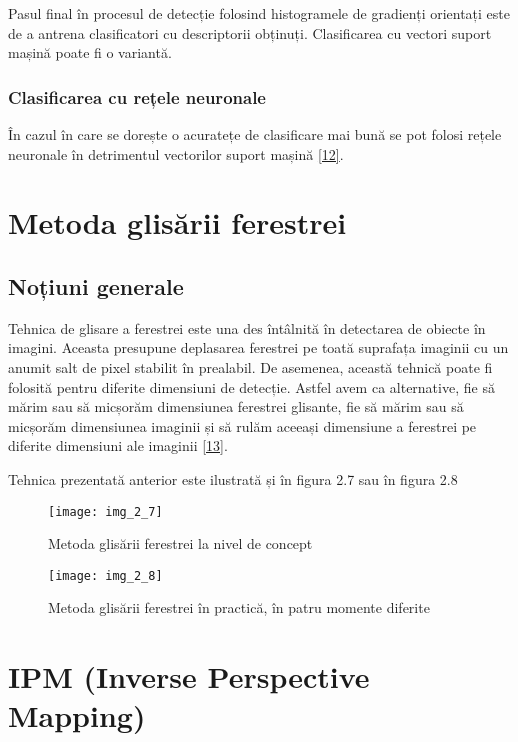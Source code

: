 Pasul final în procesul de detecție folosind histogramele de gradienți orientați este de a antrena clasificatori cu descriptorii obținuți. Clasificarea cu vectori suport mașină poate fi o variantă.

\subsubsection {Clasificarea cu rețele neuronale}

În cazul în care se dorește o acuratețe de clasificare mai bună se pot folosi rețele neuronale în detrimentul vectorilor suport mașină \hyperlink{NavneetDalalBillTriggs}{[12]}.

\section{Metoda glisării ferestrei}

\subsection{Noțiuni generale}

Tehnica de glisare a ferestrei este una des întâlnită în detectarea de obiecte în imagini. Aceasta presupune deplasarea ferestrei pe toată suprafața imaginii cu un anumit salt de pixel stabilit în prealabil. De asemenea, această tehnică poate fi folosită pentru diferite dimensiuni de detecție. Astfel avem ca alternative, fie să mărim sau să micșorăm dimensiunea ferestrei glisante, fie să mărim sau să micșorăm dimensiunea imaginii și să rulăm aceeași dimensiune a ferestrei pe diferite dimensiuni ale imaginii \hyperlink{RichardSzeliski}{[13]}.

Tehnica prezentată anterior este ilustrată și în figura 2.7 sau în figura 2.8
\begin{figure}[!h]
	\centering
	\texttt{[image: img\_2\_7]}
	\caption{Metoda glisării ferestrei la nivel de concept}
	\label{fig:nonfloat}
\end{figure}
\begin{figure}[!h]
	\centering
	\texttt{[image: img\_2\_8]}
	\caption{Metoda glisării ferestrei în practică, în patru momente diferite}
	\label{fig:nonfloat}
\end{figure}

\section{IPM (Inverse Perspective Mapping)}

